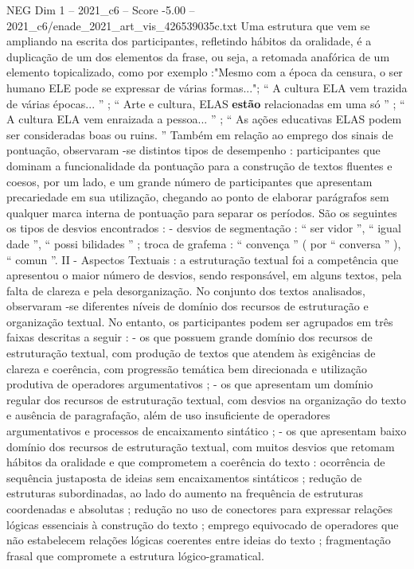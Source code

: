 \begin{textsample}{NEG Dim 1 – 2021\_c6 – Score -5.00 – 2021\_c6/enade\_2021\_art\_vis\_426539035c.txt}
Uma estrutura que vem se ampliando na escrita dos participantes, refletindo hábitos da oralidade, é a duplicação de um dos elementos da frase, ou seja, a retomada anafórica de um elemento topicalizado, como por exemplo :"Mesmo com a época da censura, o ser humano ELE pode se expressar de várias formas..."; “ A cultura ELA vem trazida de várias épocas... ” ; “ Arte e cultura, ELAS \textbf{estão} relacionadas em uma só ” ; “ A cultura ELA vem enraizada a pessoa... ” ; “ As ações educativas ELAS podem ser consideradas boas ou ruins. ” Também em relação ao emprego dos sinais de pontuação, observaram -se distintos tipos de desempenho : participantes que dominam a funcionalidade da pontuação para a construção de textos fluentes e coesos, por um lado, e um grande número de participantes que apresentam precariedade em sua utilização, chegando ao ponto de elaborar parágrafos sem qualquer marca interna de pontuação para separar os períodos.
São os seguintes os tipos de desvios encontrados : - desvios de segmentação : “ ser vidor ”, “ igual dade ”, “ possi bilidades ” ; troca de grafema : “ convença ” ( por “ conversa ” ), “ comun ”.
II - Aspectos Textuais : a estruturação textual foi a competência que apresentou o maior número de desvios, sendo responsável, em alguns textos, pela falta de clareza e pela desorganização.
No conjunto dos textos analisados, observaram -se diferentes níveis de domínio dos recursos de estruturação e organização textual.
No entanto, os participantes podem ser agrupados em três faixas descritas a seguir : - os que possuem grande domínio dos recursos de estruturação textual, com produção de textos que atendem às exigências de clareza e coerência, com progressão temática bem direcionada e utilização produtiva de operadores argumentativos ; - os que apresentam um domínio regular dos recursos de estruturação textual, com desvios na organização do texto e ausência de paragrafação, além de uso insuficiente de operadores argumentativos e processos de encaixamento sintático ; - os que apresentam baixo domínio dos recursos de estruturação textual, com muitos desvios que retomam hábitos da oralidade e que comprometem a coerência do texto : ocorrência de sequência justaposta de ideias sem encaixamentos sintáticos ; redução de estruturas subordinadas, ao lado do aumento na frequência de estruturas coordenadas e absolutas ; redução no uso de conectores para expressar relações lógicas essenciais à construção do texto ; emprego equivocado de operadores que não estabelecem relações lógicas coerentes entre ideias do texto ; fragmentação frasal que compromete a estrutura lógico-gramatical.

\end{textsample}
